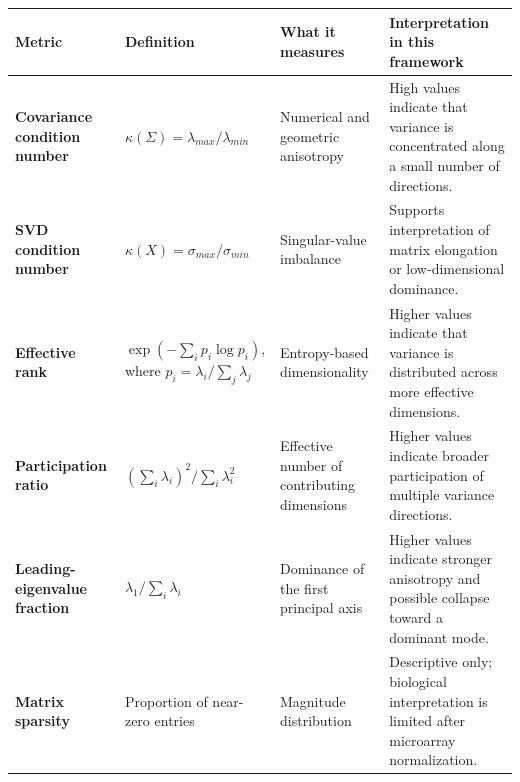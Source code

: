 \documentclass[
  letterpaper,
  DIV=11,
  numbers=noendperiod,
  openany,
  oneside]{scrreprt}
\begin{document}
\begin{longtable}[]{@{}
  >{\raggedright\arraybackslash}p{}
  >{\raggedright\arraybackslash}p{}
  >{\raggedright\arraybackslash}p{}
  >{\raggedright\arraybackslash}p{}@{}}
\toprule\noalign{}
\begin{minipage}[b]{\linewidth}\raggedright
Metric
\end{minipage} & \begin{minipage}[b]{\linewidth}\raggedright
Definition
\end{minipage} & \begin{minipage}[b]{\linewidth}\raggedright
What it measures
\end{minipage} & \begin{minipage}[b]{\linewidth}\raggedright
Interpretation in this framework
\end{minipage} \\
\midrule\noalign{}
\endhead
\bottomrule\noalign{}
\endlastfoot
\textbf{Covariance condition number} &
\(\kappa(\Sigma) = \lambda_{max}/\lambda_{min}\) & Numerical and
geometric anisotropy & High values indicate that variance is
concentrated along a small number of directions. \\
\textbf{SVD condition number} &
\(\kappa(X) = \sigma_{max}/\sigma_{min}\) & Singular-value imbalance &
Supports interpretation of matrix elongation or low-dimensional
dominance. \\
\textbf{Effective rank} & \(\exp(-\sum_i p_i \log p_i)\), where
\(p_i = \lambda_i / \sum_j \lambda_j\) & Entropy-based dimensionality &
Higher values indicate that variance is distributed across more
effective dimensions. \\
\textbf{Participation ratio} &
\((\sum_i \lambda_i)^2 / \sum_i \lambda_i^2\) & Effective number of
contributing dimensions & Higher values indicate broader participation
of multiple variance directions. \\
\textbf{Leading-eigenvalue fraction} & \(\lambda_1 / \sum_i \lambda_i\)
& Dominance of the first principal axis & Higher values indicate
stronger anisotropy and possible collapse toward a dominant mode. \\
\textbf{Matrix sparsity} & Proportion of near-zero entries & Magnitude
distribution & Descriptive only; biological interpretation is limited
after microarray normalization. \\
\end{longtable}
\end{document}
